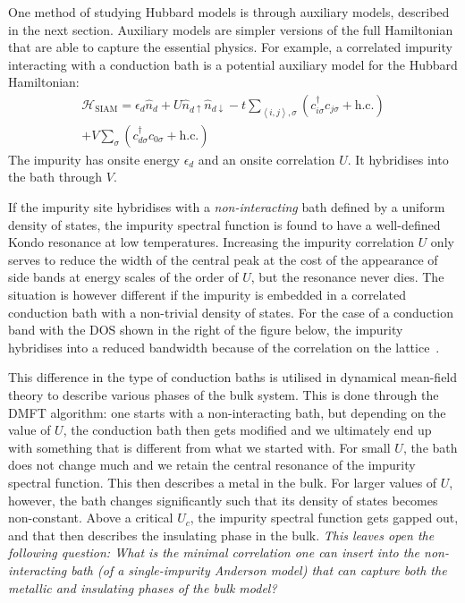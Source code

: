 \documentclass[reprint,hidelinks,onecolumn]{revtex4-2}
\begin{document}
One method of studying Hubbard models is through auxiliary models, described in the next section. Auxiliary models are simpler versions of the full Hamiltonian that are able to capture the essential physics. For example, a correlated impurity interacting with a conduction bath is a potential auxiliary model for the Hubbard Hamiltonian:
\begin{equation}\begin{aligned}
\label{clus_bath_siam}
\mathcal{H}_\text{SIAM} = \epsilon_d \hat n_d + U \hat n_{d \uparrow} \hat n_{d \downarrow} - t\sum_{\left<i,j \right>, \sigma}\left(c^\dagger_{i\sigma}c_{j\sigma} + \text{h.c.}\right) \\
+ V\sum_\sigma \left( c^\dagger_{d\sigma}c_{0\sigma} + \text{h.c.}\right) 
\end{aligned}\end{equation}
The impurity has onsite energy \(\epsilon_d\) and an onsite correlation \(U\). It hybridises into the bath through \(V\).

If the impurity site hybridises with a {\it non-interacting} bath defined by a uniform density of states, the impurity spectral function is found to have a well-defined Kondo resonance at low temperatures. Increasing the impurity correlation \(U\) only serves to reduce the width of the central peak at the cost of the appearance of side bands at energy scales of the order of \(U\), but the resonance never dies. The situation is however different if the impurity is embedded in a correlated conduction bath with a non-trivial density of states. For the case of a conduction band with the DOS shown in the right of the figure below, the impurity hybridises into a reduced bandwidth because of the correlation on the lattice~\cite{held_2013}.

This difference in the type of conduction baths is utilised in dynamical mean-field theory to describe various phases of the bulk system.
This is done through the DMFT algorithm: one starts with a non-interacting bath, but depending on the value of \(U\), the conduction bath then gets modified and we ultimately end up with something that is different from what we started with.
For small \(U\), the bath does not change much and we retain the central resonance of the impurity spectral function.
This then describes a metal in the bulk.
For larger values of \(U\), however, the bath changes significantly such that its density of states becomes non-constant.
Above a critical \(U_c\), the impurity spectral function gets gapped out, and that then describes the insulating phase in the bulk.
\textit{This leaves open the following question: What is the minimal correlation one can insert into the non-interacting bath (of a single-impurity Anderson model) that can capture both the metallic and insulating phases of the bulk model?}
\end{document}
